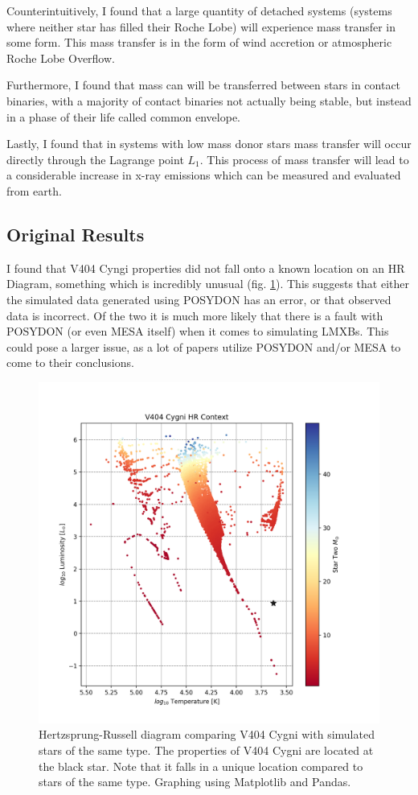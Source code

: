 \documentclass[12pt, a4paper]{article}
\begin{document}
    Counterintuitively, I found that a large quantity of detached systems (systems where neither star has filled their Roche Lobe) will experience mass transfer in some form. This mass transfer is in the form of wind accretion or atmospheric Roche Lobe Overflow.

    Furthermore, I found that mass can will be transferred between stars in contact binaries, with a majority of contact binaries not actually being stable, but instead in a phase of their life called common envelope.

    Lastly, I found that in systems with low mass donor stars mass transfer will occur directly through the Lagrange point $L_1$. This process of mass transfer will lead to a considerable increase in x-ray emissions which can be measured and evaluated from earth.
    
    \subsection{Original Results}
        I found that V404 Cyngi properties did not fall onto a known location on an HR Diagram, something which is incredibly unusual (fig. \ref{V404Cygni}). This suggests that either the simulated data generated using POSYDON has an error, or that observed data is incorrect. Of the two it is much more likely that there is a fault with POSYDON (or even MESA itself) when it comes to simulating LMXBs. This could pose a larger issue, as a lot of papers utilize POSYDON and/or MESA to come to their conclusions. 
        
        \begin{figure}[H]
            \centering
            \includegraphics[width = .6\textwidth]{figs/GeneratedFigs/V404_Cygni/V404XBsPopulationHRComp.png}
            \caption{Hertzsprung-Russell diagram comparing V404 Cygni with simulated stars of the same type. The properties of V404 Cygni are located at the black star. Note that it falls in a unique location compared to stars of the same type. Graphing using Matplotlib and Pandas.}
            \label{V404Cygni}
        \end{figure}
\end{document}
